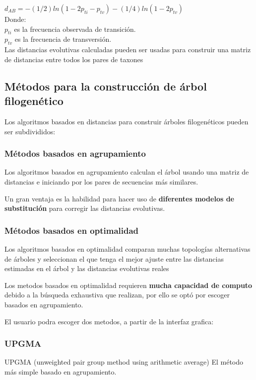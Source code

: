 \documentclass[a4paper]{article}
\begin{document}
$d_{AB} = −(1/2) ln(1 − 2p_{ti} − p_{tv}) − (1/4) ln(1 − 2p_{tv})$\\

\noindent Donde:\\
$p_{ti}$ es la frecuencia observada de transición.\\
$p_{tv}$ es la frecuencia de transversión.\\

\noindent Las distancias evolutivas calculadas pueden ser usadas para
construir una matriz de distancias entre todos los pares de taxones

\subsection{Métodos para la construcción de árbol filogenético}	

Los algoritmos basados en distancias para construir árboles
filogenéticos pueden ser subdivididos:

\subsubsection*{Métodos basados en agrupamiento}

Los algoritmos basados en agrupamiento calculan el árbol
usando una matriz de distancias e iniciando por los pares de
secuencias más similares.

\noindent Un gran ventaja es la habilidad para hacer uso de \textbf{diferentes modelos de substitución} para corregir las distancias evolutivas.

\subsubsection*{Métodos basados en optimalidad}

Los algoritmos basados en optimalidad comparan muchas
topologías alternativas de árboles y seleccionan el que tenga el
mejor ajuste entre las distancias estimadas en el árbol y las
distancias evolutivas reales

\noindent Los metodos basados en optimalidad requieren \textbf{mucha capacidad de computo} debido a la búsqueda exhaustiva que realizan, por ello se optó por escoger basados en agrupamiento.

\noindent El usuario podra escoger dos metodos, a partir de la interfaz grafica:
\subsubsection{UPGMA}
UPGMA (unweighted pair group method using arithmetic average)
El método más simple basado en agrupamiento.
\end{document}
